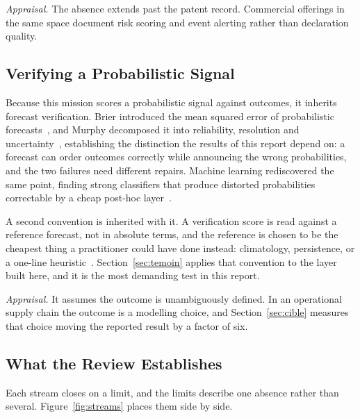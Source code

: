 \emph{Appraisal.} The absence extends past the patent record. Commercial offerings in the
same space document risk scoring and event alerting rather than declaration quality.

\subsection{Verifying a Probabilistic Signal}

Because this mission scores a probabilistic signal against outcomes, it inherits forecast
verification. Brier introduced the mean squared error of probabilistic
forecasts~\autocite{brier1950verification}, and Murphy decomposed it into reliability,
resolution and uncertainty~\autocite{murphy1973vector}, establishing the distinction the
results of this report depend on: a forecast can order outcomes correctly while announcing
the wrong probabilities, and the two failures need different repairs. Machine learning
rediscovered the same point, finding strong classifiers that produce distorted probabilities
correctable by a cheap post-hoc layer~\autocite{niculescu2005predicting,guo2017calibration}.

A second convention is inherited with it. A verification score is read against a reference
forecast, not in absolute terms, and the reference is chosen to be the cheapest thing a
practitioner could have done instead: climatology, persistence, or a one-line
heuristic~\autocite{murphy1973vector}. Section~\ref{sec:temoin} applies that convention to
the layer built here, and it is the most demanding test in this report.

\emph{Appraisal.} It assumes the outcome is unambiguously defined. In an operational supply
chain the outcome is a modelling choice, and Section~\ref{sec:cible} measures that choice
moving the reported result by a factor of six.

\subsection{What the Review Establishes}
\label{sec:gap}

\enlargethispage{3\baselineskip}

Each stream closes on a limit, and the limits describe one absence rather than several.
Figure~\ref{fig:streams} places them side by side.

